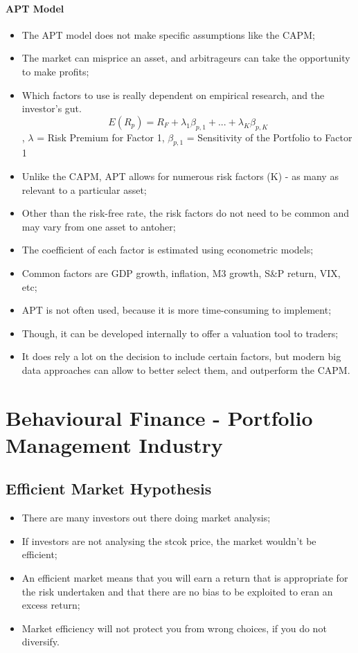 \documentclass[11pt,a4paper]{report}
\begin{document}
\subsubsection{APT Model}
\begin{itemize}
    \item The APT model does not make specific assumptions like the CAPM;
    \item The market can misprice an asset, and arbitrageurs can take the opportunity to make profits;
    \item Which factors to use is really dependent on empirical research, and the investor's gut.
    \[E(R_p) = R_F + \lambda_1\beta_{p,1} + ... + \lambda_K\beta_{p,K}\], $\lambda$ = Risk Premium for Factor 1, $\beta_{p,1}$ = Sensitivity of the Portfolio to Factor 1
    \item Unlike the CAPM, APT allows for numerous risk factors (K) - as many as relevant to a particular asset;
    \item Other than the risk-free rate, the risk factors do not need to be common and may vary from one asset to antoher;
    \item The coefficient of each factor is estimated using econometric models;
    \item Common factors are GDP growth, inflation, M3 growth, S\&P return, VIX, etc;
    \item APT is not often used, because it is more time-consuming to implement;
    \item Though, it can be developed internally to offer a valuation tool to traders;
    \item It does rely a lot on the decision to include certain factors, but modern big data approaches can allow to better select them, and outperform the CAPM.
\end{itemize}
\chapter{Behavioural Finance - Portfolio Management Industry}
\section{Efficient Market Hypothesis}
\begin{itemize}
    \item There are many investors out there doing market analysis;
    \item If investors are not analysing the stcok price, the market wouldn't be efficient;
    \item An efficient market means that you will earn a return that is appropriate for the risk undertaken and that there are no bias to be exploited to eran an excess return;
    \item Market efficiency will not protect you from wrong choices, if you do not diversify.
\end{itemize}
\end{document}
